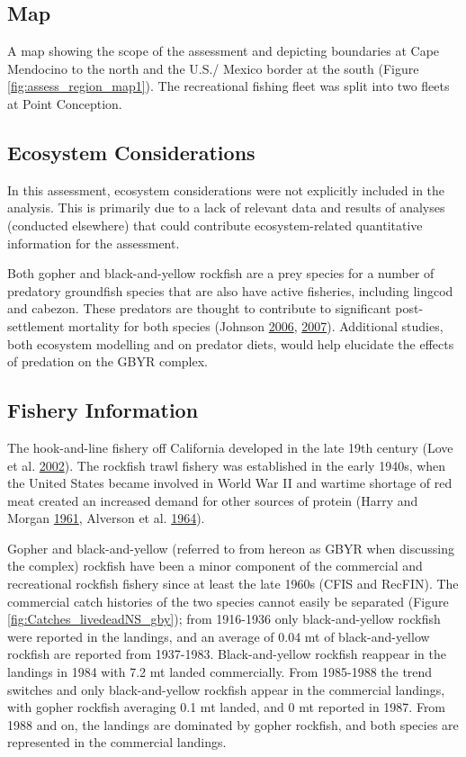 \documentclass[12pt,]{article}
\begin{document}
\subsection{Map}\label{map}

A map showing the scope of the assessment and depicting boundaries at
Cape Mendocino to the north and the U.S./ Mexico border at the south
(Figure \ref{fig:assess_region_map1}). The recreational fishing fleet
was split into two fleets at Point Conception.

\subsection{Ecosystem Considerations}\label{ecosystem-considerations-1}

In this assessment, ecosystem considerations were not explicitly
included in the analysis. This is primarily due to a lack of relevant
data and results of analyses (conducted elsewhere) that could contribute
ecosystem-related quantitative information for the assessment.

Both gopher and black-and-yellow rockfish are a prey species for a
number of predatory groundfish species that are also have active
fisheries, including lingcod and cabezon. These predators are thought to
contribute to significant post-settlement mortality for both species
(Johnson \protect\hyperlink{ref-Johnson2006}{2006},
\protect\hyperlink{ref-Johnson2007}{2007}). Additional studies, both
ecosystem modelling and on predator diets, would help elucidate the
effects of predation on the GBYR complex.

\subsection{Fishery Information}\label{fishery-information}

The hook-and-line fishery off California developed in the late 19th
century (Love et al. \protect\hyperlink{ref-Love2002}{2002}). The
rockfish trawl fishery was established in the early 1940s, when the
United States became involved in World War II and wartime shortage of
red meat created an increased demand for other sources of protein (Harry
and Morgan \protect\hyperlink{ref-Harry1961}{1961}, Alverson et al.
\protect\hyperlink{ref-Alverson1964}{1964}).

Gopher and black-and-yellow (referred to from hereon as GBYR when
discussing the complex) rockfish have been a minor component of the
commercial and recreational rockfish fishery since at least the late
1960s (CFIS and RecFIN). The commercial catch histories of the two
species cannot easily be separated (Figure
\ref{fig:Catches_livedeadNS_gby}); from 1916-1936 only black-and-yellow
rockfish were reported in the landings, and an average of 0.04 mt of
black-and-yellow rockfish are reported from 1937-1983. Black-and-yellow
rockfish reappear in the landings in 1984 with 7.2 mt landed
commercially. From 1985-1988 the trend switches and only
black-and-yellow rockfish appear in the commercial landings, with gopher
rockfish averaging 0.1 mt landed, and 0 mt reported in 1987. From 1988
and on, the landings are dominated by gopher rockfish, and both species
are represented in the commercial landings.
\end{document}
